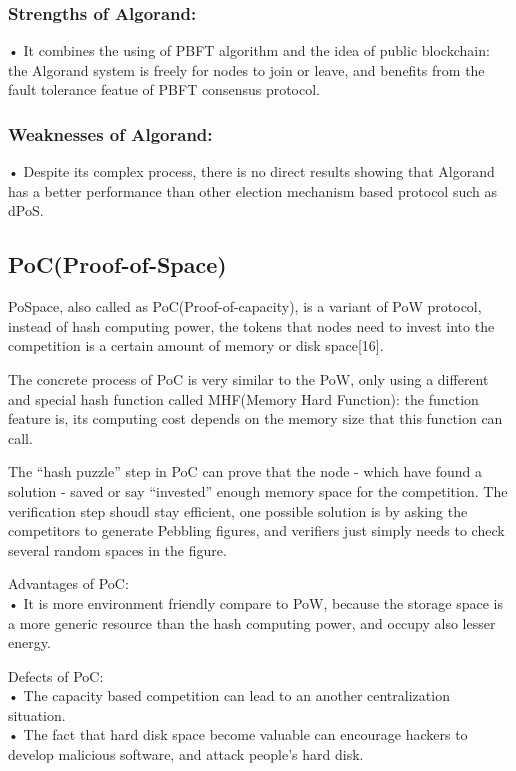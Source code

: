 \documentclass[doublespacing]{bmcart}
\begin{document}
\begin{CJK*}{UTF8}{gbsn}
\subsubsection*{Strengths of Algorand:}	
• It combines the using of PBFT algorithm and the idea of public blockchain: the Algorand system is freely for nodes to join or leave, and benefits from the fault tolerance featue of PBFT consensus protocol.
\subsubsection*{Weaknesses of Algorand:}
• Despite its complex process, there is no direct results showing that Algorand has a better performance than other election mechanism based protocol such as dPoS.

\subsection{PoC(Proof-of-Space)}
	 
	PoSpace, also called as PoC(Proof-of-capacity), is a variant of PoW protocol, instead of hash computing power, the tokens that nodes need to invest into the competition is a certain amount of memory or disk space[16].
	 
	The concrete process of PoC is very similar to the PoW, only using a different and special hash function called MHF(Memory Hard Function): the function feature is, its computing cost depends on the memory size that this function can call.
	 
	The ``hash puzzle'' step in PoC can prove that the node - which have found a solution - saved or say ``invested'' enough memory space for the competition. The verification step shoudl stay efficient, one possible solution is by asking the competitors to generate Pebbling figures, and verifiers just simply needs to check several random spaces in the figure. 
	 
Advantages of PoC:
\\• It is more environment friendly compare to PoW, because the storage space is a more generic resource than the hash computing power, and occupy also lesser energy. 
	 
Defects of PoC:
\\• The capacity based competition can lead to an another centralization situation.
\\• The fact that hard disk space become valuable can encourage hackers to develop malicious software, and attack people's hard disk.  


\end{CJK*}
\end{document}
